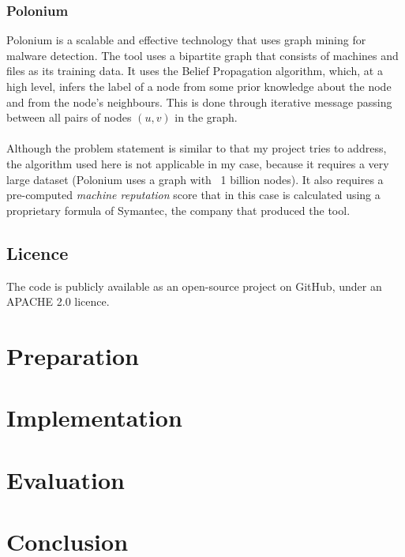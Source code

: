 \documentclass[12pt,a4paper,twoside,openright]{report}
\begin{document}
\subsection{Polonium}
Polonium is a scalable and effective technology that uses graph mining for malware detection. The tool uses a bipartite graph that consists of machines and files as its training data. It uses the Belief Propagation algorithm, which, at a high level, infers the label of a node from some prior knowledge about the node and from the node's neighbours. This is done through iterative message passing between all pairs of nodes $(u, v)$ in the graph. 
\\ \\
Although the problem statement is similar to that my project tries to address, the algorithm used here is not applicable in my case, because it requires a very large dataset (Polonium uses a graph with ~1 billion nodes). It also requires a pre-computed \textit{machine reputation} score that in this case is calculated using a proprietary formula of Symantec\footnotemark[2], the company that produced the tool. 


\section{Licence} 
The code is publicly available as an open-source project on GitHub\footnotemark[3], under an APACHE 2.0 licence\footnotemark[4]. 



\chapter{Preparation}

\chapter{Implementation}

\chapter{Evaluation}

\chapter{Conclusion}
\end{document}
